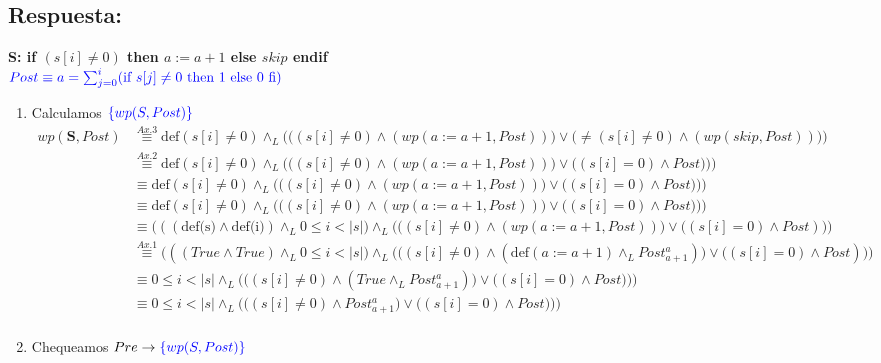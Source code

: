 \documentclass[a4paper]{article}
\begin{document}
\subsection*{Respuesta:}
\textbf{S: if $( s[i]\neq 0)$ then $a := a+1$ else $skip$ endif}\\
\hspace*{24mm}$\color{blue}Post \equiv a=\sum_{j=0}^{i}(\textrm{if }s[j] \neq 0
    \textrm{ then 1 else 0 fi})$\\
\begin{enumerate}

\item Calculamos $\color{blue}\{wp(S,Post)\}$
		\begin{align*}
		wp(\textbf{S},Post)&\stackrel{Ax.3}{\equiv} \textrm{def}(s[i]\neq 0)\wedge_L 
   					\Bigg(\Big((s[i]\neq 0)\wedge (wp(a:=a+1,Post))\Big) 
   					\vee \Big(\neq(s[i]\neq 0)\wedge (wp(skip,Post))\Big)\Bigg)\\
   			&\stackrel{Ax.2}{\equiv}  \textrm{def}(s[i]\neq 0)\wedge_L 
   				\Bigg(\Big((s[i]\neq 0)\wedge (wp(a:=a+1,Post))\Big) 
   				\vee \Big((s[i] = 0)\wedge Post)\Big)\Bigg)\\
   			&\equiv \textrm{def}(s[i]\neq 0)\wedge_L 
   				\Bigg(\Big((s[i]\neq 0)\wedge (wp(a:=a+1,Post))\Big) 
   				\vee \Big((s[i] = 0)\wedge Post)\Big)\Bigg)\\
   			&\equiv \textrm{def}(s[i]\neq 0)\wedge_L 
   				\Bigg(\Big((s[i]\neq 0)\wedge (wp(a:=a+1,Post))\Big) 
   				\vee \Big((s[i] = 0)\wedge Post)\Big)\Bigg)\\
   			&\equiv \Big(((\textrm{def(s)}\wedge
				 \textrm{def(i)})\wedge_L 0\leq i<|s|\Big)\wedge_L 
   				\Bigg(\Big((s[i]\neq 0)\wedge (wp(a:=a+1,Post))\Big) 
   				\vee \Big((s[i] = 0)\wedge Post)\Big)\Bigg)\\  
   			&\stackrel{Ax.1}{\equiv} \Big(((True\wedge
				 True)\wedge_L 0\leq i<|s|\Big)\wedge_L 
   				\Bigg(\Big((s[i]\neq 0)\wedge (\textrm{def}(a:=a+1)\wedge_L
   					Post_{a+1}^{a})\Big) \vee \Big((s[i] = 0)\wedge Post)\Big)\Bigg)\\
   			&\equiv  0\leq i<|s|\wedge_L 
   				\Bigg(\Big((s[i]\neq 0)\wedge (True \wedge_L
   					Post_{a+1}^{a})\Big) \vee \Big((s[i] = 0)\wedge Post)\Big)\Bigg)\\
   			&\equiv  0\leq i<|s|\wedge_L 
   				\Bigg(\Big((s[i]\neq 0)\wedge
   					Post_{a+1}^{a}\Big) \vee \Big((s[i] = 0)\wedge Post)\Big)\Bigg)\\ 									
		\end{align*}
\item Chequeamos $Pre \rightarrow \color{blue}\{wp(S,Post)\}$		

\end{enumerate}
\end{document}
